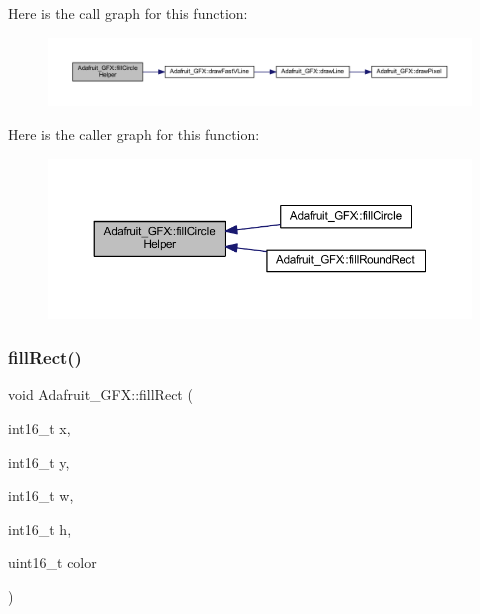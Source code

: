 Here is the call graph for this function\+:\nopagebreak
\begin{figure}[H]
\begin{center}
\leavevmode
\includegraphics[width=350pt]{class_adafruit___g_f_x_a2242d3560b08c6480084152b6660052a_cgraph}
\end{center}
\end{figure}
Here is the caller graph for this function\+:\nopagebreak
\begin{figure}[H]
\begin{center}
\leavevmode
\includegraphics[width=350pt]{class_adafruit___g_f_x_a2242d3560b08c6480084152b6660052a_icgraph}
\end{center}
\end{figure}
\mbox{\label{class_adafruit___g_f_x_aa43cf1dfe6c17d040a0f1fd5ffbe9d69}} 
\subsubsection{\texorpdfstring{fill\+Rect()}{fillRect()}}
{\footnotesize\ttfamily void Adafruit\+\_\+\+G\+F\+X\+::fill\+Rect (\begin{DoxyParamCaption}\item[{int16\+\_\+t}]{x,  }\item[{int16\+\_\+t}]{y,  }\item[{int16\+\_\+t}]{w,  }\item[{int16\+\_\+t}]{h,  }\item[{uint16\+\_\+t}]{color }\end{DoxyParamCaption})}

